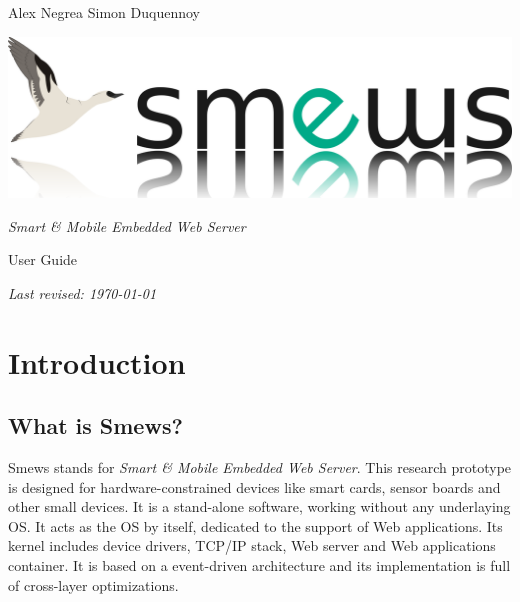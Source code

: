 \documentclass{report}
\begin{document}
\begin{titlepage}

\begin{center}
\large
Alex Negrea \hspace{2cm} Simon Duquennoy
\end{center}

\vspace{6cm}

\begin{center}
\includegraphics{smewsLogo}
\end{center}

\begin{center}
\LARGE
{\em Smart \& Mobile Embedded Web Server}

User Guide
\end{center}

\vfill

\begin{center}
\em
Last revised: \today
\end{center}

\end{titlepage}

\tableofcontents
 
\chapter{Introduction}

\section{What is Smews?}

Smews stands for \emph{Smart \& Mobile Embedded Web Server}. This research prototype is designed for hardware-constrained devices like smart cards, sensor boards and other small devices. It is a stand-alone software, working without any underlaying OS. It acts as the OS by itself, dedicated to the support of Web applications. Its kernel includes device drivers, TCP/IP stack, Web server and Web applications container. It is based on a event-driven architecture and its implementation is full of cross-layer optimizations.
\end{document}
